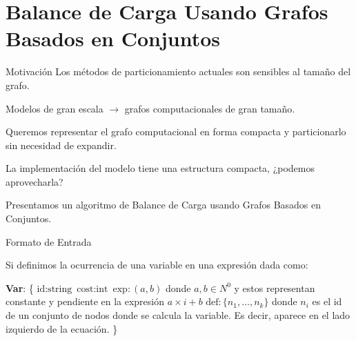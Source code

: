 \section{Balance de Carga Usando Grafos Basados en Conjuntos}


\begin{frame}{Motivación}
  Los métodos de particionamiento actuales son sensibles al tamaño del grafo.

  Modelos de gran escala $\to$ grafos computacionales de gran tamaño.

  Queremos representar el grafo computacional en forma compacta y particionarlo
  sin necesidad de expandir.

  La implementación del modelo tiene una estructura compacta, ¿podemos aprovecharla?\pause

  Presentamos un algoritmo de Balance de Carga usando Grafos Basados en Conjuntos.
\end{frame}


\begin{frame}{Formato de Entrada}

 Si definimos la ocurrencia de una variable en una expresión dada como:

\begin{small}
    \begin{algorithm}[H]
        \begin{algorithmic}\caption{Tipo Var}
            \State \textbf{Var}: \{
                \State $\text{id}: \text{string}$ 
                \State $\text{cost}: \text{int}$
                \State $\text{exp}: (a,b)$ donde $a, b \in N^0$ y estos representan constante y
                pendiente en la expresión $a \times i + b$
                \State $\text{def}: \{ n_1 , \ldots , n_k \}$ donde $n_i$ es el id de un conjunto
                de nodos donde se calcula la variable. Es decir, aparece en el lado izquierdo
                de la ecuación.
            \State \} 
        \end{algorithmic}
    \end{algorithm}
\end{small}
\end{frame}


